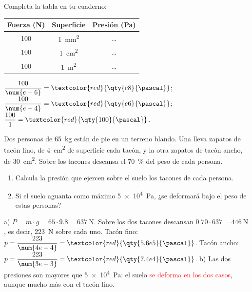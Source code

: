 \begin{exercise}
    Completa la tabla en tu cuaderno:
    \begin{center}
        \begin{tabular}{@{}ccc@{}}
            \toprule
            \textbf{Fuerza (N)} & \textbf{Superficie} & \textbf{Presión (Pa)} \\
            \midrule
            100 & \qty{1}{\square\mm} & \ldots \\[3pt]
            100 & \qty{1}{\square\cm} & \ldots \\[3pt]
            100 & \qty{1}{\square\m} & \ldots \\
            \bottomrule
        \end{tabular}
    \end{center}
    \begin{solu}
        \(\dfrac{100}{\num{e-6}} = \textcolor{red}{\qty{e8}{\pascal}}\); \(\dfrac{100}{\num{e-4}} = \textcolor{red}{\qty{e6}{\pascal}}\); \(\dfrac{100}{1} = \textcolor{red}{\qty{100}{\pascal}}\).
    \end{solu}
\end{exercise}

\begin{exercise}
    Dos personas de \qty{65}{\kg} están de pie en un terreno blando. Una lleva zapatos de tacón fino, de \qty{4}{\square\cm} de superficie cada tacón, y la otra zapatos de tacón ancho, de \qty{30}{\square\cm}. Sobre los tacones descansa el \qty{70}{\percent} del peso de cada persona.
    \begin{enumerate}[label=\alph*)]
        \item Calcula la presión que ejercen sobre el suelo los tacones de cada persona.
        \item Si el suelo aguanta como máximo \qty{5e4}{\pascal}, ¿se deformará bajo el peso de estas personas?
    \end{enumerate}
    \begin{solu}
        a) \(P = m \cdot g = 65 \cdot \num{9.8} = \qty{637}{\newton}\). Sobre los dos tacones descansan \(\num{0.70} \cdot 637 = \qty{446}{\newton}\), es decir, \qty{223}{\newton} sobre cada uno.
        Tacón fino: \(p = \dfrac{223}{\num{4e-4}} = \textcolor{red}{\qty{5.6e5}{\pascal}}\). Tacón ancho: \(p = \dfrac{223}{\num{3e-3}} = \textcolor{red}{\qty{7.4e4}{\pascal}}\).
        b) Las dos presiones son mayores que \qty{5e4}{\pascal}: el suelo \textcolor{red}{se deforma en los dos casos}, aunque mucho más con el tacón fino.
    \end{solu}
\end{exercise}

